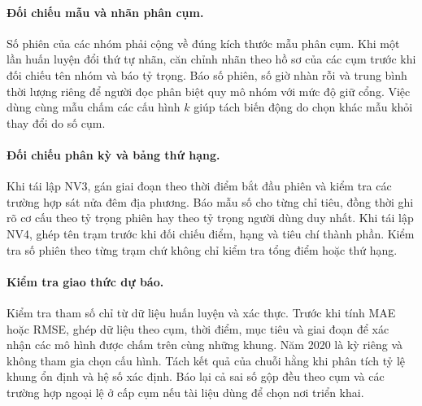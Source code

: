\documentclass[conference,a4paper]{IEEEtran}
\begin{document}
\paragraph{Đối chiếu mẫu và nhãn phân cụm.}
Số phiên của các nhóm phải cộng về đúng kích thước mẫu phân cụm. Khi một lần huấn luyện đổi thứ tự nhãn, căn chỉnh nhãn theo hồ sơ của các cụm trước khi đối chiếu tên nhóm và báo tỷ trọng. Báo số phiên, số giờ nhàn rỗi và trung bình thời lượng riêng để người đọc phân biệt quy mô nhóm với mức độ giữ cổng. Việc dùng cùng mẫu chấm các cấu hình $k$ giúp tách biến động do chọn khác mẫu khỏi thay đổi do số cụm.

\paragraph{Đối chiếu phân kỳ và bảng thứ hạng.}
Khi tái lập NV3, gán giai đoạn theo thời điểm bắt đầu phiên và kiểm tra các trường hợp sát nửa đêm địa phương. Báo mẫu số cho từng chỉ tiêu, đồng thời ghi rõ cơ cấu theo tỷ trọng phiên hay theo tỷ trọng người dùng duy nhất. Khi tái lập NV4, ghép tên trạm trước khi đối chiếu điểm, hạng và tiêu chí thành phần. Kiểm tra số phiên theo từng trạm chứ không chỉ kiểm tra tổng điểm hoặc thứ hạng.

\paragraph{Kiểm tra giao thức dự báo.}
Kiểm tra tham số chỉ từ dữ liệu huấn luyện và xác thực. Trước khi tính MAE hoặc RMSE, ghép dữ liệu theo cụm, thời điểm, mục tiêu và giai đoạn để xác nhận các mô hình được chấm trên cùng những khung. Năm 2020 là kỳ riêng và không tham gia chọn cấu hình. Tách kết quả của chuỗi hằng khi phân tích tỷ lệ khung ổn định và hệ số xác định. Báo lại cả sai số gộp đều theo cụm và các trường hợp ngoại lệ ở cấp cụm nếu tài liệu dùng để chọn nơi triển khai.
\end{document}
